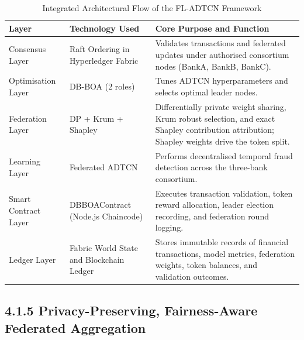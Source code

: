 \begin{table}[htbp]
\centering
\caption{Integrated Architectural Flow of the FL-ADTCN Framework}
\label{tab:integrated_arch_flow}
\begin{tabular}{|p{2.6cm}|p{3.6cm}|p{7.2cm}|}
\hline
\textbf{Layer} & \textbf{Technology Used} & \textbf{Core Purpose and Function} \\ \hline
Consensus Layer & Raft Ordering in Hyperledger Fabric & Validates transactions and federated updates under authorised consortium nodes (BankA, BankB, BankC). \\ \hline
Optimisation Layer & DB-BOA (2 roles) & Tunes ADTCN hyperparameters and selects optimal leader nodes. \\ \hline
Federation Layer & DP + Krum + Shapley & Differentially private weight sharing, Krum robust selection, and exact Shapley contribution attribution; Shapley weights drive the token split. \\ \hline
Learning Layer & Federated ADTCN & Performs decentralised temporal fraud detection across the three-bank consortium. \\ \hline
Smart Contract Layer & DBBOAContract (Node.js Chaincode) & Executes transaction validation, token reward allocation, leader election recording, and federation round logging. \\ \hline
Ledger Layer & Fabric World State and Blockchain Ledger & Stores immutable records of financial transactions, model metrics, federation weights, token balances, and validation outcomes. \\ \hline
\end{tabular}
\end{table}

\subsection*{4.1.5 Privacy-Preserving, Fairness-Aware Federated Aggregation}
\label{sec:fed-layer}

\begin{center}
\end{center}

